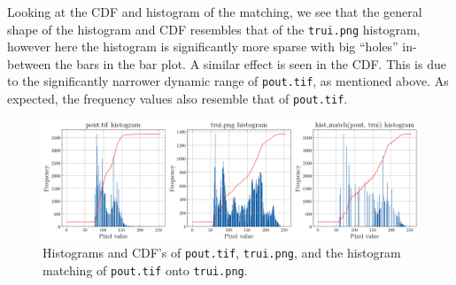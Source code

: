 Looking at the CDF and histogram of the matching, we see that the general shape
of the histogram and CDF resembles that of the \texttt{trui.png} histogram,
however here the histogram is significantly more sparse with big ``holes''
in-between the bars in the bar plot. A similar effect is seen in the CDF. This
is due to the significantly narrower dynamic range of \texttt{pout.tif}, as
mentioned above. As expected, the frequency values also resemble that of
\texttt{pout.tif}.

\begin{figure}[H]
    \centering
    \includegraphics[width=\textwidth]{figures/task_3_4_histograms.png}
    \caption{Histograms and CDF's of \texttt{pout.tif}, \texttt{trui.png}, and
    the histogram matching of \texttt{pout.tif} onto \texttt{trui.png}.}
    \label{fig:3.4.b}
\end{figure}
